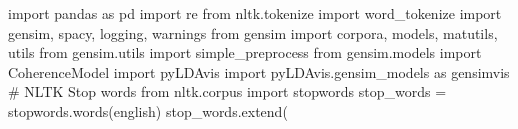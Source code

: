 \documentclass[
  letterpaper,
  DIV=11,
  numbers=noendperiod]{scrreprt}
\newenvironment{Shaded}{\begin{snugshade}}{\end{snugshade}}
\newcommand{\CommentTok}[1]{\textcolor[rgb]{0.37,0.37,0.37}{#1}}
\newcommand{\ImportTok}[1]{\textcolor[rgb]{0.00,0.46,0.62}{#1}}
\newcommand{\NormalTok}[1]{\textcolor[rgb]{0.00,0.23,0.31}{#1}}
\newcommand{\OperatorTok}[1]{\textcolor[rgb]{0.37,0.37,0.37}{#1}}
\newcommand{\StringTok}[1]{\textcolor[rgb]{0.13,0.47,0.30}{#1}}
\begin{document}
\begin{Shaded}
\begin{Highlighting}[]
\ImportTok{import}\NormalTok{ pandas }\ImportTok{as}\NormalTok{ pd}
\ImportTok{import}\NormalTok{ re}
\ImportTok{from}\NormalTok{ nltk.tokenize }\ImportTok{import}\NormalTok{ word\_tokenize}
\ImportTok{import}\NormalTok{ gensim, spacy, logging, warnings}
\ImportTok{from}\NormalTok{ gensim }\ImportTok{import}\NormalTok{ corpora, models, matutils, utils}
\ImportTok{from}\NormalTok{ gensim.utils }\ImportTok{import}\NormalTok{ simple\_preprocess}
\ImportTok{from}\NormalTok{ gensim.models }\ImportTok{import}\NormalTok{ CoherenceModel}
\ImportTok{import}\NormalTok{ pyLDAvis }
\ImportTok{import}\NormalTok{ pyLDAvis.gensim\_models }\ImportTok{as}\NormalTok{ gensimvis}
\CommentTok{\# NLTK Stop words}
\ImportTok{from}\NormalTok{ nltk.corpus }\ImportTok{import}\NormalTok{ stopwords}
\NormalTok{stop\_words }\OperatorTok{=}\NormalTok{ stopwords.words(}\StringTok{\textquotesingle{}english\textquotesingle{}}\NormalTok{)}
\NormalTok{stop\_words.extend(}

\end{Highlighting}
\end{Shaded}
\end{document}
